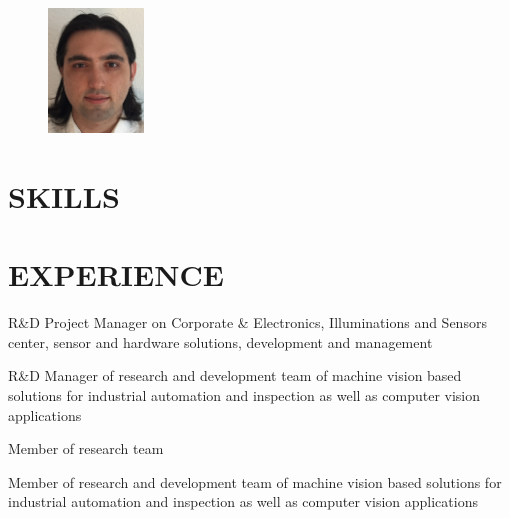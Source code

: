 \documentclass[margin]{res}
\begin{document}
	\address{Bordenbergweg Str. 64367, M\"uhltal\\
		\hspace{.5in}+49 176 62 01 37 66\\
		\hspace{.4in}cihansari86@gmail.com}
	\begin{resume}
		\begin{figure}
			\vspace{-1in}
			\includegraphics[width=1in]{me.jpg}
		\end{figure}
		
		\sectionspace
		\section{SKILLS}
		
		\sectionspace

		\section{EXPERIENCE}
		{R\&D Project Manager on Corporate \& Electronics, Illuminations and Sensors center, sensor and hardware solutions, development and management}
		
		{R\&D Manager of research and development team of machine vision based solutions for industrial automation and inspection as well as computer vision applications}
		
		{Member of research team}
		
		{Member of research and development team of machine vision based solutions for industrial automation and inspection as well as computer vision applications}
		

\end{resume}
\end{document}

